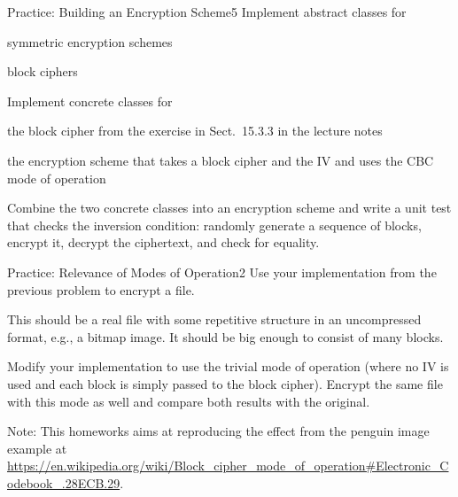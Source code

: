\documentclass[a4paper]{article}
\begin{document}
\header

\begin{problem}{Practice: Building an Encryption Scheme}{5}
Implement abstract classes for
\begin{compactitem}
 \item symmetric encryption schemes
 \item block ciphers
\end{compactitem}

Implement concrete classes for
\begin{compactitem}
 \item the block cipher from the exercise in Sect.~15.3.3 in the lecture notes
 \item the encryption scheme that takes a block cipher and the IV and uses the CBC mode of operation
\end{compactitem}

Combine the two concrete classes into an encryption scheme and write a unit test that checks the inversion condition: randomly generate a sequence of blocks, encrypt it, decrypt the ciphertext, and check for equality.
\end{problem}

\begin{problem}{Practice: Relevance of Modes of Operation}{2}
Use your implementation from the previous problem to encrypt a file.

This should be a real file with some repetitive structure in an uncompressed format, e.g., a bitmap image.
It should be big enough to consist of many blocks.

Modify your implementation to use the trivial mode of operation (where no IV is used and each block is simply passed to the block cipher).
Encrypt the same file with this mode as well and compare both results with the original.

Note: This homeworks aims at reproducing the effect from the penguin image example at \url{https://en.wikipedia.org/wiki/Block_cipher_mode_of_operation#Electronic_Codebook_.28ECB.29}.
\end{problem}
\end{document}
